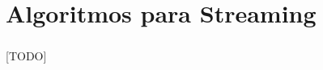 \documentclass{subfiles}
\begin{document}
  \chapter{Algoritmos para Streaming}
  \label{chapter:streaming}

    \paragraph{}
    [TODO]
    
\end{document}
